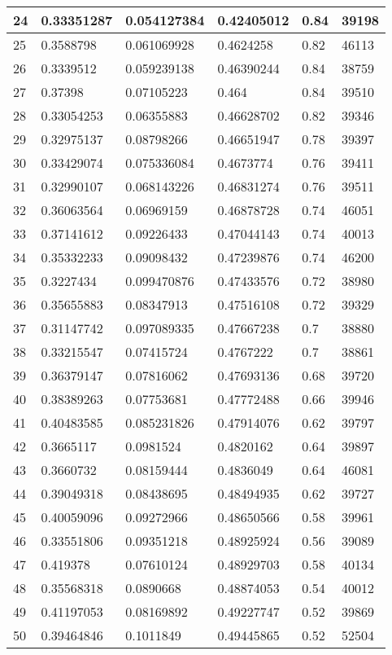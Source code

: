 \begin{longtable}{|l|l|l|l|l|l|}
24 & 0.33351287 & 0.054127384 & 0.42405012 & 0.84 & 39198 \\ \hline 
25 & 0.3588798 & 0.061069928 & 0.4624258 & 0.82 & 46113 \\ \hline 
26 & 0.3339512 & 0.059239138 & 0.46390244 & 0.84 & 38759 \\ \hline 
27 & 0.37398 & 0.07105223 & 0.464 & 0.84 & 39510 \\ \hline 
28 & 0.33054253 & 0.06355883 & 0.46628702 & 0.82 & 39346 \\ \hline 
29 & 0.32975137 & 0.08798266 & 0.46651947 & 0.78 & 39397 \\ \hline 
30 & 0.33429074 & 0.075336084 & 0.4673774 & 0.76 & 39411 \\ \hline 
31 & 0.32990107 & 0.068143226 & 0.46831274 & 0.76 & 39511 \\ \hline 
32 & 0.36063564 & 0.06969159 & 0.46878728 & 0.74 & 46051 \\ \hline 
33 & 0.37141612 & 0.09226433 & 0.47044143 & 0.74 & 40013 \\ \hline 
34 & 0.35332233 & 0.09098432 & 0.47239876 & 0.74 & 46200 \\ \hline 
35 & 0.3227434 & 0.099470876 & 0.47433576 & 0.72 & 38980 \\ \hline 
36 & 0.35655883 & 0.08347913 & 0.47516108 & 0.72 & 39329 \\ \hline 
37 & 0.31147742 & 0.097089335 & 0.47667238 & 0.7 & 38880 \\ \hline 
38 & 0.33215547 & 0.07415724 & 0.4767222 & 0.7 & 38861 \\ \hline 
39 & 0.36379147 & 0.07816062 & 0.47693136 & 0.68 & 39720 \\ \hline 
40 & 0.38389263 & 0.07753681 & 0.47772488 & 0.66 & 39946 \\ \hline 
41 & 0.40483585 & 0.085231826 & 0.47914076 & 0.62 & 39797 \\ \hline 
42 & 0.3665117 & 0.0981524 & 0.4820162 & 0.64 & 39897 \\ \hline 
43 & 0.3660732 & 0.08159444 & 0.4836049 & 0.64 & 46081 \\ \hline 
44 & 0.39049318 & 0.08438695 & 0.48494935 & 0.62 & 39727 \\ \hline 
45 & 0.40059096 & 0.09272966 & 0.48650566 & 0.58 & 39961 \\ \hline 
46 & 0.33551806 & 0.09351218 & 0.48925924 & 0.56 & 39089 \\ \hline 
47 & 0.419378 & 0.07610124 & 0.48929703 & 0.58 & 40134 \\ \hline 
48 & 0.35568318 & 0.0890668 & 0.48874053 & 0.54 & 40012 \\ \hline 
49 & 0.41197053 & 0.08169892 & 0.49227747 & 0.52 & 39869 \\ \hline 
50 & 0.39464846 & 0.1011849 & 0.49445865 & 0.52 & 52504 \\ \hline 
\end{longtable}